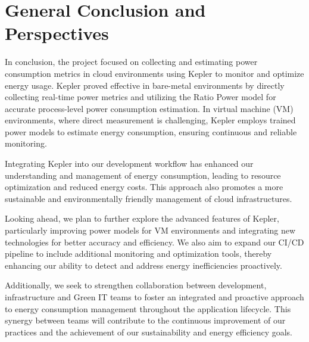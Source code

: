 \chapter*{General Conclusion and Perspectives}




\label{chap:General Conclusion} 

In conclusion, the project focused on collecting and estimating power consumption metrics in cloud environments using Kepler to monitor and optimize energy usage. Kepler proved effective in bare-metal environments by directly collecting real-time power metrics and utilizing the Ratio Power model for accurate process-level power consumption estimation. In virtual machine (VM) environments, where direct measurement is challenging, Kepler employs trained power models to estimate energy consumption, ensuring continuous and reliable monitoring.

Integrating Kepler into our development workflow has enhanced our understanding and management of energy consumption, leading to resource optimization and reduced energy costs. This approach also promotes a more sustainable and environmentally friendly management of cloud infrastructures.

Looking ahead, we plan to further explore the advanced features of Kepler, particularly improving power models for VM environments and integrating new technologies for better accuracy and efficiency. We also aim to expand our CI/CD pipeline to include additional monitoring and optimization tools, thereby enhancing our ability to detect and address energy inefficiencies proactively.

Additionally, we seek to strengthen collaboration between development, infrastructure and Green IT teams to foster an integrated and proactive approach to energy consumption management throughout the application lifecycle. This synergy between teams will contribute to the continuous improvement of our practices and the achievement of our sustainability and energy efficiency goals.

